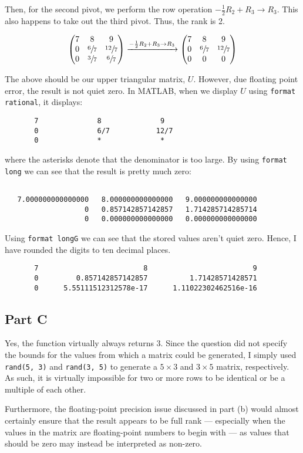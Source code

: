 \documentclass[12pt]{article}
\newcommand{\code}[1]{\texttt{#1}}
\begin{document}
Then, for the second pivot, we perform the row operation $-\frac{1}{2}R_2 + R_3 \to R_3$. This also happens to take out the third pivot. Thus, the rank is 2.

$$
\begin{pmatrix}
     7 & 8 & 9 \\
     0 & \sfrac{6}{7} & \sfrac{12}{7} \\
     0 & \sfrac{3}{7} & \sfrac{6}{7}
\end{pmatrix}
\xrightarrow[]{-\frac{1}{2}R_2 + R_3 \to R_3}
\begin{pmatrix}
     7 & 8 & 9 \\
     0 & \sfrac{6}{7} & \sfrac{12}{7} \\
     0 & 0 & 0
\end{pmatrix}
$$

The above should be our upper triangular matrix, $U$. However, due floating point error, the result is not quiet zero. In MATLAB, when we display $U$ using \code{format rational}, it displays:

\begin{verbatim}
       7              8              9       
       0              6/7           12/7     
       0              *              *   
\end{verbatim}

where the asterisks denote that the denominator is too large. By using \code{format long} we can see that the result is pretty much zero:

\begin{verbatim}
    
   7.000000000000000   8.000000000000000   9.000000000000000
                   0   0.857142857142857   1.714285714285714
                   0   0.000000000000000   0.000000000000000
\end{verbatim}

Using \code{format longG} we can see that the stored values aren't quiet zero. Hence, I have rounded the digits to ten decimal places.

\begin{verbatim}
       7                         8                         9
       0         0.857142857142857          1.71428571428571
       0      5.55111512312578e-17      1.11022302462516e-16
\end{verbatim}

\subsection*{Part C}

Yes, the function virtually always returns 3. Since the question did not specify the bounds for the values from which a matrix could be generated, I simply used \code{rand(5, 3)} and \code{rand(3, 5)} to generate a $5\times3$ and $3\times5$ matrix, respectively. As such, it is virtually impossible for two or more rows to be identical or be a multiple of each other.

Furthermore, the floating-point precision issue discussed in part (b) would almost certainly ensure that the result appears to be full rank --- especially when the values in the matrix are floating-point numbers to begin with --- as values that should be zero may instead be interpreted as non-zero.
\end{document}
